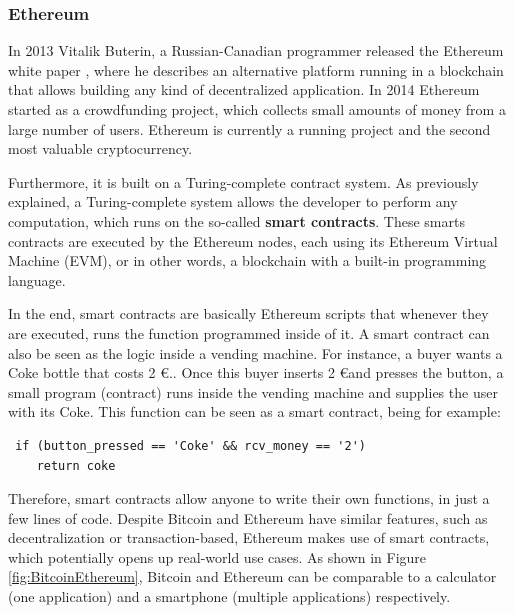 \subsubsection{Ethereum}

In 2013 Vitalik Buterin, a Russian-Canadian programmer released the Ethereum white paper \cite{buterin2014next}, where he describes an alternative platform running in a blockchain that allows building any kind of decentralized application. In 2014 Ethereum started as a crowdfunding project, which collects small amounts of money from a large number of users.  Ethereum is currently a running project and the second most valuable cryptocurrency.

Furthermore, it is built on a Turing-complete contract system. As previously explained, a Turing-complete system allows the developer to perform any computation, which runs on the so-called \textbf{smart contracts}. These smarts contracts are executed by the Ethereum nodes, each using its Ethereum Virtual Machine (EVM), or in other words, a blockchain with a built-in programming language.

In the end, smart contracts are basically Ethereum scripts that whenever they are executed, runs the function programmed inside of it. A smart contract can also be seen as the logic inside a vending machine. For instance, a buyer wants a Coke bottle that costs 2 \euro.. Once this buyer inserts 2 \euro and presses the button, a small program (contract) runs inside the vending machine and supplies the user with its Coke. This function can be seen as a smart contract, being for example:

\begin{lstlisting}
 if (button_pressed == 'Coke' && rcv_money == '2')
 	return coke
\end{lstlisting}

Therefore, smart contracts allow anyone to write their own functions, in just a few lines of code. Despite Bitcoin and Ethereum have similar features, such as decentralization or transaction-based, Ethereum makes use of smart contracts, which potentially opens up real-world use cases. As shown in Figure \ref{fig:BitcoinEthereum}, Bitcoin and Ethereum can be comparable to a calculator (one application) and a smartphone (multiple applications) respectively.

